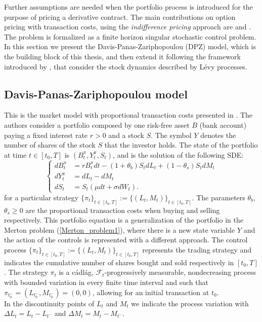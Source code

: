 Further assumptions are needed when the portfolio process is introduced for the purpose of pricing a derivative contract.
The main contributions on option pricing with transaction costs, using the \emph{indifference pricing} approach are
\cite{HoNe89} and \cite{DaPaZa93}. The problem is formalized as a finite horizon singular stochastic control problem.
In this section we present the Davis-Panas-Zariphopoulou (DPZ) model, 
which is the building block of this thesis, and then extend it following the framework introduced by \cite{Kab16}, 
that consider the stock dynamics described by Lévy processes.



\subsection{Davis-Panas-Zariphopoulou model}\label{DPZ_sec}

This is the market model with proportional transaction costs presented in \cite{DaPaZa93}. 
The authors consider a portfolio composed by one risk-free asset $B$ (bank account) paying a fixed interest rate $r > 0$ and a stock $S$. 
The symbol $Y$ denotes the number of shares of the stock $S$ that the investor holds. 
The state of the portfolio at time $t\in [t_0,T]$ is $(B^{\pi}_t,Y^{\pi}_t,S_t)$, and is the solution of the following SDE:
\begin{equation}\label{DPZ_porfolio_dynamics}
 \begin{cases}
 dB^{\pi}_t &=  rB^{\pi}_t dt - (1+\theta_b)S_t dL_t + (1-\theta_s) S_t dM_t \\
 dY^{\pi}_t &=  dL_t - dM_t \\
 dS_t &=  S_t \left( \mu dt + \sigma dW_t \right).
\end{cases}
\end{equation} 
for a particular strategy $\{\pi_t\}_{t \in [t_0,T]} := \{(L_t,M_t)\}_{t \in [t_0,T]}$.
The parameters $\theta_b$, $\theta_s \geq 0$ are the proportional transaction costs when buying and selling respectively.
This portfolio equation is a generalization of the portfolio in the Merton problem (\ref{Merton_problem1}), 
where there is a new state variable $Y$ and the action of the controls is represented with a different approach.
The control process $\{\pi_t\}_{t \in [t_0,T]} := \{(L_t,M_t)\}_{t \in [t_0,T]}$ represents the trading strategy and indicates the 
cumulative number of shares bought and sold respectively in $[t_0,T]$.
The strategy $\pi_t$ is a cádlág, $\mathcal{F}_t$-progressively measurable, nondecreasing process with bounded variation in every finite time interval and such that
$ \pi_{t_0^-} = ( L_{t_0^-} , M_{t_0^-} ) = (0,0) $, allowing for an initial transaction at $t_0$.\\
In the discontinuity points of $L_t$ and $M_t$ we indicate the process variation with $\Delta L_t= L_{t}-L_{t^-}$ and $\Delta M_t= M_{t}-M_{t^-}$.

